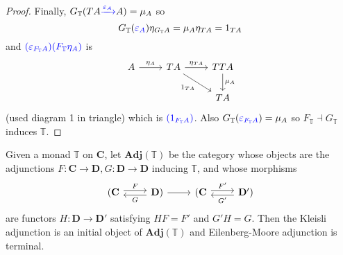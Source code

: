 \documentclass[a4paper]{article}
\renewcommand{\c}[1]{\mathbf{#1}}
\newcommand{\adjoint}{\dashv}
\newcommand{\T}{{\mathbb{T}}} %
\newcommand{\blue}[1]{\textcolor{blue}{#1}}
\begin{document}
\begin{proof}
  Finally, \(G_\T(TA \blue{\xrightarrow{\varepsilon_A}} A) = \mu_A\) so
   \[
     G_\T(\blue{\varepsilon_A}) \eta_{G_\T A} = \mu_A \eta_{TA} = 1_{TA}
   \]
   and \(\blue{(\varepsilon_{F_\T A}) (F_\T \eta_A)}\) is
   \[
     \begin{tikzcd}
       A \ar[r, "\eta_A"] & TA \ar[r, "\eta_{TA}"] \ar[dr, "1_{TA}"'] & TTA \ar[d, "\mu_A"] \\
       & & TA
     \end{tikzcd}
   \]
    (used diagram 1 in triangle) which is \(\blue{(1_{F_\T A})}\). Also \(G_\T(\blue{\varepsilon_{F_\T A}}) = \mu_A\) so \(F_\T \adjoint G_\T\) induces \(\T\).
\end{proof}

\begin{theorem}
  Given a monad \(\T\) on \(\c C\), let \(\c{Adj} (\T)\) be the category whose objects are the adjunctions \(F: \c C \to \c D, G: \c D \to \c D\) inducing \(\T\), and whose morphisms
  \[
    \begin{tikzcd}
      (\c C \ar[r, shift left, "F"] & \c D) \ar[l, shift left, "G"] \ar[r] & (\c C \ar[r, shift left, "F'"] & \c D') \ar[l, shift left, "G'"]
    \end{tikzcd}
  \]
  are functors \(H: \c D \to \c D'\) satisfying \(HF = F'\) and \(G'H = G\). Then the Kleisli adjunction is an initial object of \(\c{Adj} (\T)\) and Eilenberg-Moore adjunction is terminal.
\end{theorem}
\end{document}
